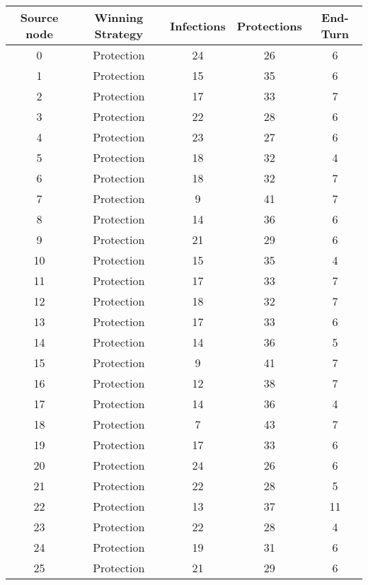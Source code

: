 \documentclass[results.tex]{subfiles}
\begin{document}
\begin{center}
  \begin{tabular}{| c || c | c | c | c |}
    \hline
    {\bfseries Source node} & {\bfseries Winning Strategy} & {\bfseries Infections} & {\bfseries Protections} & {\bfseries End-Turn} \\  %
    \hline\hline
    0 & Protection & 24 & 26 & 6 \\ 
    \hline
    1 & Protection & 15 & 35 & 6 \\ 
    \hline
    2 & Protection & 17 & 33 & 7 \\ 
    \hline
    3 & Protection & 22 & 28 & 6 \\ 
    \hline
    4 & Protection & 23 & 27 & 6 \\ 
    \hline
    5 & Protection & 18 & 32 & 4 \\ 
    \hline
    6 & Protection & 18 & 32 & 7 \\ 
    \hline
    7 & Protection & 9 & 41 & 7 \\ 
    \hline
    8 & Protection & 14 & 36 & 6 \\ 
    \hline
    9 & Protection & 21 & 29 & 6 \\ 
    \hline
    10 & Protection & 15 & 35 & 4 \\ 
    \hline
    11 & Protection & 17 & 33 & 7 \\ 
    \hline
    12 & Protection & 18 & 32 & 7 \\ 
    \hline
    13 & Protection & 17 & 33 & 6 \\ 
    \hline
    14 & Protection & 14 & 36 & 5 \\ 
    \hline
    15 & Protection & 9 & 41 & 7 \\ 
    \hline
    16 & Protection & 12 & 38 & 7 \\ 
    \hline
    17 & Protection & 14 & 36 & 4 \\ 
    \hline
    18 & Protection & 7 & 43 & 7 \\ 
    \hline
    19 & Protection & 17 & 33 & 6 \\ 
    \hline
    20 & Protection & 24 & 26 & 6 \\ 
    \hline
    21 & Protection & 22 & 28 & 5 \\ 
    \hline
    22 & Protection & 13 & 37 & 11 \\ 
    \hline
    23 & Protection & 22 & 28 & 4 \\ 
    \hline
    24 & Protection & 19 & 31 & 6 \\ 
    \hline
    25 & Protection & 21 & 29 & 6 \\ 

\end{tabular}
\end{center}
\end{document}
